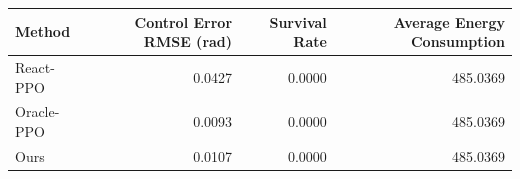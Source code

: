\begin{tabular}{lrrr}
\toprule
Method & Control Error RMSE (rad) & Survival Rate & Average Energy Consumption \\
\midrule
React-PPO & 0.0427 & 0.0000 & 485.0369 \\
Oracle-PPO & 0.0093 & 0.0000 & 485.0369 \\
Ours & 0.0107 & 0.0000 & 485.0369 \\
\bottomrule
\end{tabular}

